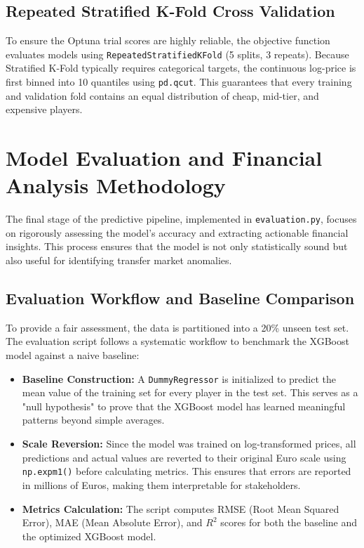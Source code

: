\documentclass[a4paper,12pt]{report}
\begin{document}
\subsection{Repeated Stratified K-Fold Cross Validation}

To ensure the Optuna trial scores are highly reliable, the objective function evaluates models using \texttt{RepeatedStratifiedKFold} (5 splits, 3 repeats). Because Stratified K-Fold typically requires categorical targets, the continuous log-price is first binned into 10 quantiles using \texttt{pd.qcut}. This guarantees that every training and validation fold contains an equal distribution of cheap, mid-tier, and expensive players.

\section{Model Evaluation and Financial Analysis Methodology}

The final stage of the predictive pipeline, implemented in \texttt{evaluation.py}, focuses on rigorously assessing the model's accuracy and extracting actionable financial insights. This process ensures that the model is not only statistically sound but also useful for identifying transfer market anomalies.

\subsection{Evaluation Workflow and Baseline Comparison}

To provide a fair assessment, the data is partitioned into a 20\% unseen test set. The evaluation script follows a systematic workflow to benchmark the XGBoost model against a naive baseline:

\begin{itemize}
    \item \textbf{Baseline Construction:} A \texttt{DummyRegressor} is initialized to predict the mean value of the training set for every player in the test set. This serves as a "null hypothesis" to prove that the XGBoost model has learned meaningful patterns beyond simple averages.
    \item \textbf{Scale Reversion:} Since the model was trained on log-transformed prices, all predictions and actual values are reverted to their original Euro scale using \texttt{np.expm1()} before calculating metrics. This ensures that errors are reported in millions of Euros, making them interpretable for stakeholders.
    \item \textbf{Metrics Calculation:} The script computes RMSE (Root Mean Squared Error), MAE (Mean Absolute Error), and $R^2$ scores for both the baseline and the optimized XGBoost model.
\end{itemize}
\end{document}
